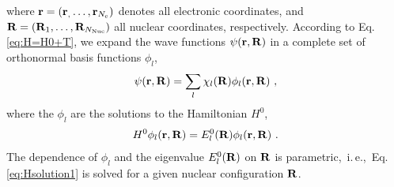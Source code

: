 where \mbox{${\bf r} = ({\bf r}_, \ldots, {\bf r}_{N_{\rm e}})$} denotes all electronic coordinates, and ${\bf R} = ({\bf R}_1, \ldots, {\bf R}_{N_{\rm Nuc}})$ all nuclear coordinates, respectively. According to Eq.\,\eqref{eq:H=H0+T}, we expand the wave functions $\psi ({\bf r}, {\bf R})$ in a complete set of orthonormal basis functions $\phi_l$,
\begin{align}
\psi ({\bf r}, {\bf R}) = \sum_l \chi_l ({\bf R}) \phi_l ({\bf r}, {\bf R})~,
\label{eq:psi_expansion_phi}
\end{align}
where the $\phi_l$ are the solutions to the Hamiltonian $H^0$,
\begin{align}
    H^0 \phi_l ({\bf r}, {\bf R})
        = E^0_l ({\bf R}) \phi_l ({\bf r}, {\bf R})~.
    \label{eq:Hsolution1}
\end{align}
The dependence of $\phi_l$ and the eigenvalue $E_l^0({\bf R})$ on $\bf R$ is parametric,~i.\,e.,~Eq.\,\eqref{eq:Hsolution1} is solved for a given nuclear configuration $\bf R$.

